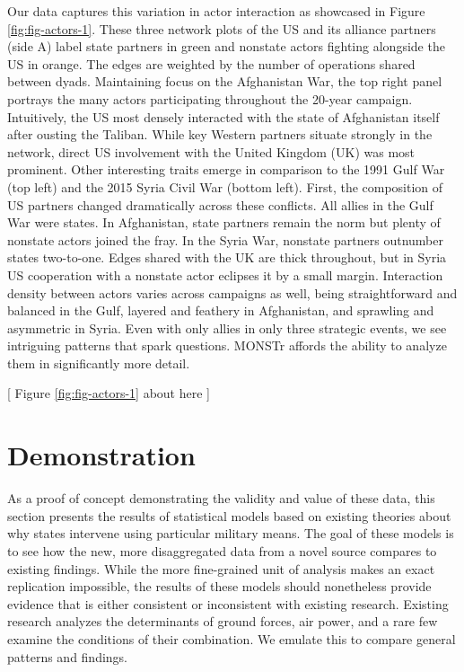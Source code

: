 \documentclass[fleqn,12pt]{article}
\begin{document}
Our data captures this variation in actor interaction as showcased in Figure \ref{fig:fig-actors-1}. These three network plots of the US and its alliance partners (side A) label state partners in green and nonstate actors fighting alongside the US in orange. The edges are weighted by the number of operations shared between dyads. Maintaining focus on the Afghanistan War, the top right panel portrays the many actors participating throughout the 20-year campaign. Intuitively, the US most densely interacted with the state of Afghanistan itself after ousting the Taliban. While key Western partners situate strongly in the network, direct US involvement with the United Kingdom (UK) was most prominent. Other interesting traits emerge in comparison to the 1991 Gulf War (top left) and the 2015 Syria Civil War (bottom left). First, the composition of US partners changed dramatically across these conflicts. All allies in the Gulf War were states. In Afghanistan, state partners remain the norm but plenty of nonstate actors joined the fray. In the Syria War, nonstate partners outnumber states two-to-one. Edges shared with the UK are thick throughout, but in Syria US cooperation with a nonstate actor eclipses it by a small margin. Interaction density between actors varies across campaigns as well, being straightforward and balanced in the Gulf, layered and feathery in Afghanistan, and sprawling and asymmetric in Syria. Even with only allies in only three strategic events, we see intriguing patterns that spark questions. MONSTr affords the ability to analyze them in significantly more detail.

\begin{center}
	[ Figure \ref{fig:fig-actors-1} about here ]    
\end{center}

\section*{Demonstration}
As a proof of concept demonstrating the validity and value of these data, this section presents the results of statistical models based on existing theories about why states intervene using particular military means. The goal of these models is to see how the new, more disaggregated data from a novel source compares to existing findings. While the more fine-grained unit of analysis makes an exact replication impossible, the results of these models should nonetheless provide evidence that is either consistent or inconsistent with existing research. Existing research analyzes the determinants of ground forces, air power, and a rare few examine the conditions of their combination. We emulate this to compare general patterns and findings. 
\end{document}
